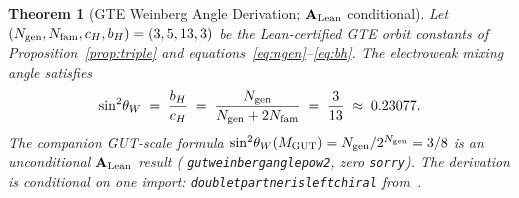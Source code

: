 \documentclass[11pt]{article}
\newtheorem{theorem}{Theorem}[section]
\theoremstyle{remark}
\newcommand{\Ngen}{N_{\rm gen}}
\newcommand{\Nfam}{N_{\rm fam}}
\newcommand{\bH}{b_H}
\newcommand{\cH}{c_H}
\newcommand{\lean}[1]{%
  \penalty-100
  \begingroup\def\_{\textunderscore\allowbreak}\texttt{#1}\endgroup}
\newcommand{\sinwsq}{\sin^2\!\theta_W}
\newcommand{\CatAL}{\ensuremath{\textbf{A}_{\rm Lean}}}
\begin{document}
\begin{theorem}[GTE Weinberg Angle Derivation; $\CatAL$ conditional]
\label{thm:weinberg_main}
Let $(\Ngen, \Nfam, \cH, \bH) = (3, 5, 13, 3)$ be the Lean-certified GTE orbit
constants of Proposition~\ref{prop:triple} and equations~\eqref{eq:ngen}--\eqref{eq:bh}.
The electroweak mixing angle satisfies
\begin{equation}
  \sinwsq \;=\; \frac{\bH}{\cH} \;=\; \frac{\Ngen}{\Ngen + 2\Nfam}
  \;=\; \frac{3}{13} \;\approx\; 0.23077.
\label{eq:weinberg_main_thm}
\end{equation}
The companion GUT-scale formula
$\sinwsq(M_{\rm GUT}) = \Ngen/2^{\Ngen} = 3/8$
is an unconditional $\CatAL$ result
(\lean{gut\_weinberg\_angle\_pow2}, zero \texttt{sorry}).
The derivation is conditional on one import:
\lean{doublet\_partner\_is\_left\_chiral} from~\cite{Spivack2026_UGPDynamics}.
\end{theorem}
\end{document}
